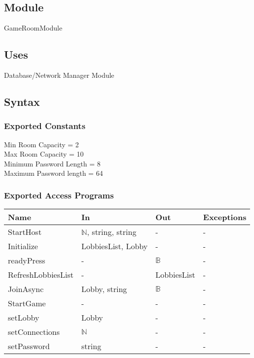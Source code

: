 \documentclass[12pt, titlepage]{article}
\begin{document}
\subsection{Module}

GameRoomModule

\subsection{Uses}

Database/Network Manager Module

\subsection{Syntax}

\subsubsection{Exported Constants}

Min Room Capacity = 2\\
Max Room Capacity = 10\\
Minimum Password Length = 8\\
Maximum Password length = 64\\

\subsubsection{Exported Access Programs}

\begin{center}
\begin{tabular}{p{5cm} p{4cm} p{4cm} p{2cm}}
\hline
\textbf{Name} & \textbf{In} & \textbf{Out} & \textbf{Exceptions} \\
\hline
StartHost & $\mathbb{N}$, string, string & - & - \\
Initialize  & LobbiesList, Lobby & - & - \\
readyPress  & - & $\mathbb{B}$ & - \\
RefreshLobbiesList  & - & LobbiesList & - \\
JoinAsync  & Lobby, string & $\mathbb{B}$ & - \\
StartGame & - & - & - \\
setLobby  & Lobby & - & - \\
setConnections & $\mathbb{N}$ & - & - \\
setPassword & string & - & - \\
\hline
\end{tabular}
\end{center}
\end{document}
